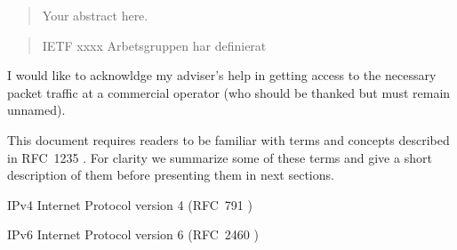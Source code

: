 \documentclass[12pt,a4paper,twoside,openright]{book}
\begin{document}
\frontmatter
{}
\begin{abstract}
\label{sec:abstract}
\setcounter{page}{1}


Your abstract here.

\end{abstract}
{}
\begin{abstract}
\label{sec:swedish_abstract}


IETF xxxx Arbetsgruppen har definierat 
\end{abstract}

\begin{acknowledgements}
I would like to acknowldge my adviser's help in getting access to the
necessary packet traffic at a commercial operator (who should be thanked but
must remain unnamed).
\end{acknowledgements}

\tableofcontents

\listoffigures

\listoftables



\renewcommand\abbreviationsname{List of Acronyms and Abbreviations}
\begin{abbreviations}
\label{list-of-acronyms-and-abbreviations}

This document requires readers to be familiar with terms and concepts described in \mbox{RFC~1235} \cite{john_ioannidis_coherent_1991}. For clarity we summarize some of these terms and give a short description of them before presenting them in next sections.

\begin{basedescript}{\desclabelstyle{\pushlabel}\desclabelwidth{10em}}
\item[IPv4]					Internet Protocol version 4 (RFC~791 \cite{postel_internet_1981})
\item[IPv6]					Internet Protocol version 6 (RFC~2460 \cite{deering_internet_1998})
\end{basedescript}
\end{abbreviations}
\end{document}
